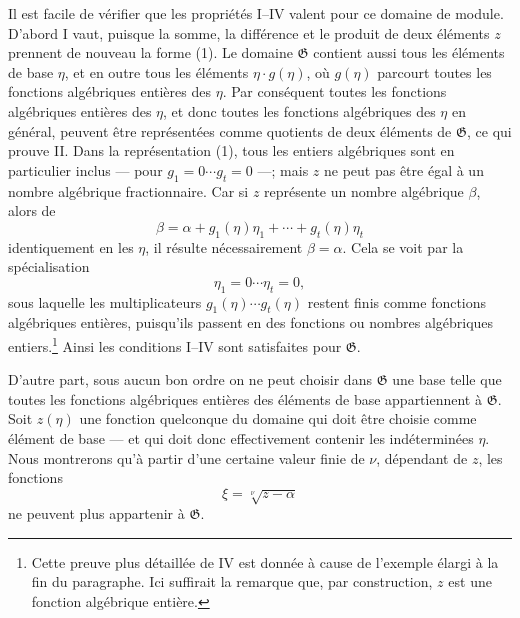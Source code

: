 Il est facile de vérifier que les propriétés I--IV valent pour ce domaine de module. D'abord I vaut, puisque la somme, la différence et le produit de deux éléments $z$ prennent de nouveau la forme (1). Le domaine $\mathfrak G$ contient aussi tous les éléments de base $\eta$, et en outre tous les éléments $\eta\cdot g(\eta)$, où $g(\eta)$ parcourt toutes les fonctions algébriques entières des $\eta$. Par conséquent toutes les fonctions algébriques entières des $\eta$, et donc toutes les fonctions algébriques des $\eta$ en général, peuvent être représentées comme quotients de deux éléments de $\mathfrak G$, ce qui prouve II. Dans la représentation (1), tous les entiers algébriques sont en particulier inclus --- pour $g_1=0\cdots g_t=0$ ---; mais $z$ ne peut pas être égal à un nombre algébrique fractionnaire. Car si $z$ représente un nombre algébrique $\beta$, alors de
\[
 \beta=\alpha+g_1(\eta)\eta_1+\cdots+g_t(\eta)\eta_t
\]
identiquement en les $\eta$, il résulte nécessairement $\beta=\alpha$. Cela se voit par la spécialisation
\[
 \eta_1=0\cdots \eta_t=0,
\]
sous laquelle les multiplicateurs $g_1(\eta)\cdots g_t(\eta)$ restent finis comme fonctions algébriques entières, puisqu'ils passent en des fonctions ou nombres algébriques entiers.\footnote{Cette preuve plus détaillée de IV est donnée à cause de l'exemple élargi à la fin du paragraphe. Ici suffirait la remarque que, par construction, $z$ est une fonction algébrique entière.} Ainsi les conditions I--IV sont satisfaites pour $\mathfrak G$.

D'autre part, sous aucun bon ordre on ne peut choisir dans $\mathfrak G$ une base telle que toutes les fonctions algébriques entières des éléments de base appartiennent à $\mathfrak G$. Soit $z(\eta)$ une fonction quelconque du domaine qui doit être choisie comme élément de base --- et qui doit donc effectivement contenir les indéterminées $\eta$. Nous montrerons qu'à partir d'une certaine valeur finie de $\nu$, dépendant de $z$, les fonctions
\[
 \xi=\sqrt[\nu]{z-\alpha}
\]
ne peuvent plus appartenir à $\mathfrak G$.

